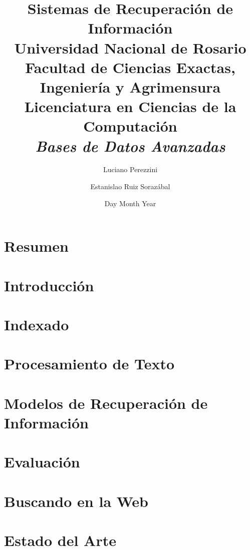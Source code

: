 \documentclass[11pt, spanish]{report}
\title{
	{\huge Sistemas de Recuperación de Información}\\
	{\Large Universidad Nacional de Rosario}\\
	{\large Facultad de Ciencias Exactas, Ingeniería y Agrimensura}\\
	{\small Licenciatura en Ciencias de la Computación}\\
	{\small {\itshape Bases de Datos Avanzadas}}
}
\author{Luciano Perezzini \and Estanislao Ruiz Sorazábal}
\date{Day Month Year}
\begin{document}
	\maketitle
	
	\chapter*{Resumen}
		
				
	\tableofcontents
	
	\chapter{Introducción}
		
				
	\chapter{Indexado}
		

	\chapter{Procesamiento de Texto}
		
		
		
	\chapter{Modelos de Recuperación de Información}
		
		
	\chapter{Evaluación}
		
		
	\chapter{Buscando en la Web}
		

	\chapter{Estado del Arte}
		
\end{document}
